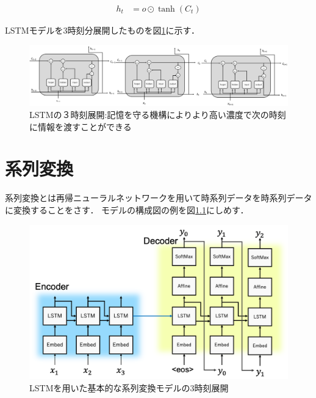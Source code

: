 \documentclass[a4j,11pt,report]{jsbook}
\begin{document}
\begin{equation}
  \label{eq:all3}
  \begin{split}
    h_{t} &= o \odot \tanh(C_{t})
  \end{split}
\end{equation}

LSTMモデルを3時刻分展開したものを図\ref{fig:LSTM_3timeconcat}に示す．

\begin{center}
  \begin{figure}[H]
    \centering
    \includegraphics[width=\linewidth]{image/LSTM_concat.png}
    \caption{LSTMの３時刻展開:記憶を守る機構によりより高い濃度で次の時刻に情報を渡すことができる}
    \label{fig:LSTM_3timeconcat}
  \end{figure}
\end{center}






\chapter{系列変換\label{ch:Seq2Seq}}

系列変換とは再帰ニューラルネットワークを用いて時系列データを時系列データに変換することをさす．
モデルの構成図の例を図\ref{fig:seq2seq_3time}にしめす．

\begin{center}
  \begin{figure}[tbh]
    \centering
    \includegraphics[width=\linewidth]{image/seq2seq_image.png}
    \caption{LSTMを用いた基本的な系列変換モデルの3時刻展開　}
    \label{fig:seq2seq_3time}
  \end{figure}
\end{center}
\end{document}
